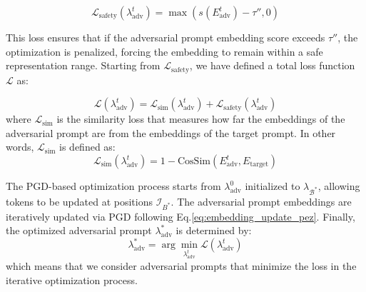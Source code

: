 \documentclass[acmsmall]{acmart}
\begin{document}
{\begin{equation}\label{eq:loss_safety}
\mathcal{L}_{\text{safety}}(\lambda_{\text{adv}}^{t}) = \max \left( s(E^t_{\text{adv}}) - \tau'', 0 \right)
\end{equation}

This loss ensures that if the adversarial prompt embedding score exceeds \( \tau'' \), the optimization is penalized, forcing the embedding to remain within a safe representation range. Starting from $\mathcal{L}_{\text{safety}}$, we have defined a total loss function \( \mathcal{L} \) as:

\begin{equation}
\mathcal{L}(\lambda_{\text{adv}}^{t}) = \mathcal{L}_{\text{sim}}(\lambda_{\text{adv}}^{t}) + \mathcal{L}_{\text{safety}}(\lambda_{\text{adv}}^{t})
\end{equation}
where $\mathcal{L}_{\text{sim}}$ is the similarity loss that measures how far the embeddings of the adversarial prompt are from the embeddings of the target prompt. In other words, $\mathcal{L}_{\text{sim}}$ is defined as:
\begin{equation}
\mathcal{L}_{\text{sim}}(\lambda_{\text{adv}}^{t}) = 1 - \text{CosSim}(E^t_{\text{adv}}, E_{\text{target}})
\end{equation}

The PGD-based optimization process starts from $\lambda_{\text{adv}}^{0}$ initialized to $\lambda_{\mathcal{B}^*}$, allowing tokens to be updated at positions \(\mathcal{I}_{B^*}\). The adversarial prompt embeddings are iteratively updated via PGD following Eq.\ref{eq:embedding_update_pez}. Finally, the optimized adversarial prompt \( \lambda_{\text{adv}}^* \) is determined by:
\begin{equation}
  \lambda_{\text{adv}}^* = \arg\min_{\lambda_{\text{adv}}^{t}} \mathcal{L}(\lambda_{\text{adv}}^{t})  
\end{equation}
which means that we consider adversarial prompts that minimize the loss in the iterative optimization process.


}
\end{document}
